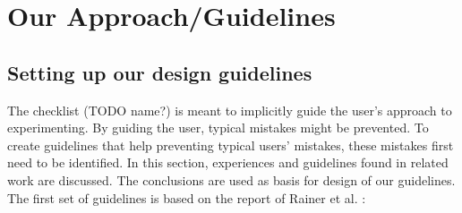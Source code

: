 
\newcommand{\obsrvQuote}[1]{\textit{``#1''} }


\section{Our Approach/Guidelines}

\subsection{Setting up our design guidelines}

The checklist (TODO name?) is meant to implicitly guide the user's approach to experimenting.
By guiding the user, typical mistakes might be prevented.
To create guidelines that help preventing typical users' mistakes, these mistakes first need to be identified.
In this section, experiences and guidelines found in related work are discussed.
The conclusions are used as basis for design of our guidelines.
The first set of guidelines is based on the report of Rainer et al. \cite{Rainer2006}:

